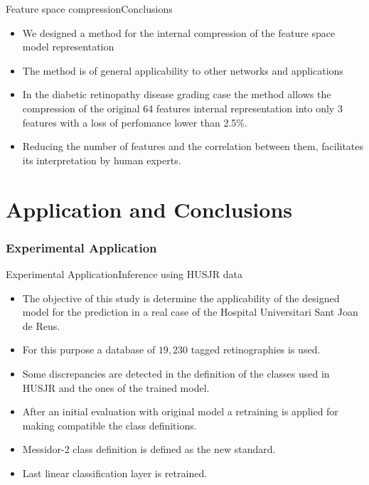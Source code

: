 \documentclass{beamer}
\begin{document}

\begin{frame}{Feature space compression}{Conclusions}	
\begin{itemize}
	\item We designed a method for the internal compression of the feature space model representation
	\item The method is of general applicability to other networks and applications
	\item In the diabetic retinopathy disease grading case the method allows the compression of the original 64 features internal representation into only 3 features with a loss of perfomance lower than 2.5\%.
	\item Reducing the number of features and the correlation between them, facilitates its interpretation by human experts.
 \end{itemize}
\end{frame}

\part{Application and Conclusions}

\section{Experimental Application}

\begin{frame}{Experimental Application}{Inference using HUSJR data}
\begin{itemize}
	\item The objective of this study is determine the applicability of the designed model for the prediction in a real case of the Hospital Universitari Sant Joan de Reus.
	\item For this purpose a database of $19,230$ tagged retinographies is used.
	\item Some discrepancies are detected in the definition of the classes used in HUSJR and the ones of the trained model.
	\item After an initial evaluation with original model a retraining is applied for making compatible the class definitions.
	\item Messidor-2 class definition is defined as the new standard.
	\item Last linear classification layer is retrained.
\end{itemize}
\end{frame}
\end{document}
